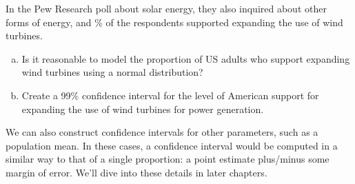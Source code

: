 \begin{exercisewrap}
\begin{nexercise}
\label{pew_wind_turbine_support_normal_dist_gp}%
In the Pew Research poll about solar energy, they
also inquired about other forms of energy,
and \pewwindpollpercent{}\% of the \pewwindpollsize{}
respondents supported expanding the use of wind
turbines.\footnotemark{}
\begin{enumerate}[(a)]
\item
    Is it reasonable to model the proportion
    of US adults who support expanding wind turbines
    using a normal distribution?
\item
    Create a 99\% confidence interval for the level of American
    support for expanding the use of wind turbines for power
    generation.
\end{enumerate}
\end{nexercise}
\end{exercisewrap}

We can also construct confidence intervals for other
parameters, such as a population mean.
In these cases, a confidence interval would be computed
in a similar way to that of a single proportion:
a point estimate plus/minus some margin of error.
We'll dive into these details in later chapters.


